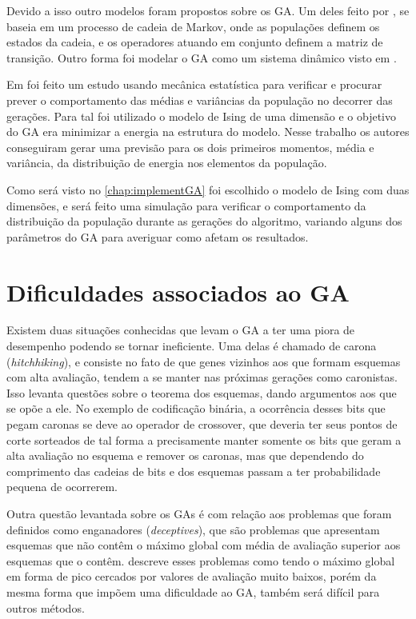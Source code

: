 Devido a isso outro modelos foram propostos sobre os GA. Um deles feito por \citeauthor{Nix1992}, se baseia em um processo de cadeia de Markov, onde as populações definem os estados da cadeia, e os operadores atuando em conjunto definem a matriz de transição. Outro forma foi modelar o GA como um sistema dinâmico visto em .

Em  foi feito um estudo usando mecânica estatística para verificar e procurar prever o comportamento das médias e variâncias da população no decorrer das gerações. Para tal foi utilizado o modelo de Ising de uma dimensão e o objetivo do GA era minimizar a energia na estrutura do modelo. Nesse trabalho os autores conseguiram gerar uma previsão para os dois primeiros momentos, média e variância, da distribuição de energia nos elementos da população.

Como será visto no \autoref{chap:implementGA} foi escolhido o modelo de Ising com duas dimensões, e será feito uma simulação para verificar o comportamento da distribuição da população durante as gerações do algoritmo, variando alguns dos parâmetros do GA para averiguar como afetam os resultados.

\section{Dificuldades associados ao GA}
\label{sec:problemas_GA}
Existem duas situações conhecidas que levam o GA a ter uma piora de desempenho podendo se tornar ineficiente. Uma delas é chamado de carona (\textit{hitchhiking}), e consiste no fato de que genes vizinhos aos que formam esquemas com alta avaliação, tendem a se manter nas próximas gerações como caronistas. Isso levanta questões sobre o teorema dos esquemas, dando argumentos aos que se opõe a ele. No exemplo de codificação binária, a ocorrência desses bits que pegam caronas se deve ao operador de crossover, que deveria ter seus pontos de corte sorteados de tal forma a precisamente manter somente os bits que geram a alta avaliação no esquema e remover os caronas, mas que dependendo do comprimento das cadeias de bits e dos esquemas passam a ter probabilidade pequena de ocorrerem. 

Outra questão levantada sobre os GAs é com relação aos problemas que foram definidos como enganadores (\textit{deceptives}), que são problemas que apresentam esquemas que não contêm o máximo global com média de avaliação superior aos esquemas que o contêm. \citeauthor{Linden2008} descreve esses problemas como tendo o máximo global em forma de pico cercados por valores de avaliação muito baixos, porém da mesma forma que impõem uma dificuldade ao GA, também será difícil para outros métodos.

